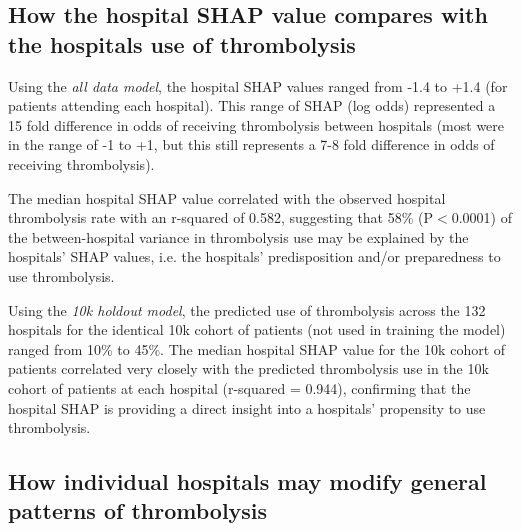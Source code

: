 \fi



\subsection{How the hospital SHAP value compares with the hospitals use of thrombolysis}

Using the \emph{all data model}, the hospital SHAP values ranged from -1.4 to +1.4 (for patients attending each hospital). This range of SHAP (log odds) represented a 15 fold difference in odds of receiving thrombolysis between hospitals (most were in the range of -1 to +1, but this still represents a 7-8 fold difference in odds of receiving thrombolysis).

The median hospital SHAP value correlated with the observed hospital thrombolysis rate with an r-squared of 0.582, suggesting that 58\% (P$<$0.0001) of the between-hospital variance in thrombolysis use may be explained by the hospitals' SHAP values, i.e. the hospitals' predisposition and/or preparedness to use thrombolysis.

Using the \emph{10k holdout model}, the predicted use of thrombolysis across the 132 hospitals for the identical 10k cohort of patients (not used in training the model) ranged from 10\% to 45\%. The median hospital SHAP value for the 10k cohort of patients correlated very closely with the predicted thrombolysis use in the 10k cohort of patients at each hospital (r-squared = 0.944), confirming that the hospital SHAP is providing a direct insight into a hospitals' propensity to use thrombolysis.


\subsection{How individual hospitals may modify general patterns of thrombolysis}


